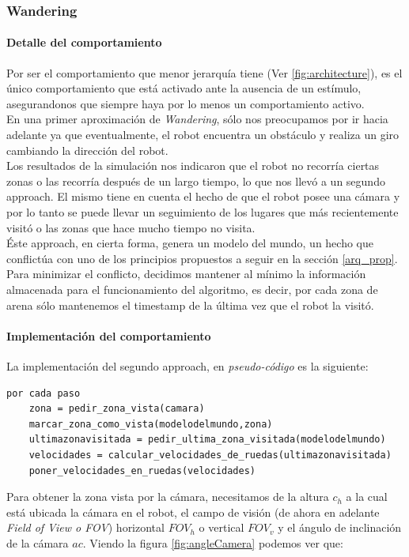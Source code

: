 \subsubsection{Wandering}
\label{wandering}

\paragraph{Detalle del comportamiento} 
Por ser el comportamiento que menor jerarqu\'ia tiene (Ver \ref{fig:architecture}), es el \'unico
comportamiento que est\'a activado ante la ausencia de un est\'imulo, asegurandonos que siempre
haya por lo menos un comportamiento activo.
\\
En una primer aproximaci\'on de \emph{Wandering}, s\'olo nos preocupamos por ir hacia adelante
ya que eventualmente, el robot encuentra un obst\'aculo y realiza un giro cambiando la direcci\'on
del robot.
\\
Los resultados de la simulaci\'on nos indicaron que el robot no recorr\'ia ciertas zonas o las recorr\'ia
despu\'es de un largo tiempo, lo que nos llev\'o a un segundo approach. El mismo tiene en cuenta el hecho
de que el robot posee una c\'amara y por lo tanto se puede llevar un seguimiento de los lugares que m\'as
recientemente visit\'o o las zonas que hace mucho tiempo no visita.
\\
\'Este approach, en cierta forma, genera un modelo del mundo, un hecho que conflict\'ua con uno de
los principios propuestos a seguir en la secci\'on \ref{arq_prop}. Para minimizar el conflicto, decidimos
mantener al m\'inimo la informaci\'on almacenada para el funcionamiento del algoritmo, es decir, por cada
zona de arena s\'olo mantenemos el timestamp de la \'ultima vez que el robot la visit\'o.

\paragraph{Implementaci\'on del comportamiento}

La implementaci\'on del segundo approach, en \emph{pseudo-c\'odigo} es la siguiente:
\begin{verbatim}
por cada paso
    zona = pedir_zona_vista(camara)
    marcar_zona_como_vista(modelodelmundo,zona)
    ultimazonavisitada = pedir_ultima_zona_visitada(modelodelmundo)
    velocidades = calcular_velocidades_de_ruedas(ultimazonavisitada)
    poner_velocidades_en_ruedas(velocidades)
\end{verbatim}
Para obtener la zona vista por la c\'amara, necesitamos de la altura $c_h$ a la cual est\'a ubicada
la c\'amara en el robot, el campo de visi\'on (de ahora en adelante \emph{Field of View o FOV})
horizontal $FOV_h$ o vertical $FOV_v$ y el \'angulo de inclinaci\'on de la c\'amara $ac$. Viendo la figura
\ref{fig:angleCamera} podemos ver que:

